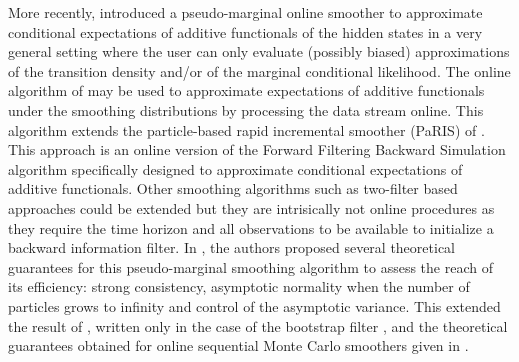 \documentclass{article}
\begin{document}
More recently,  \cite{gloaguen2021pseudo} introduced a pseudo-marginal online smoother to approximate conditional expectations of additive functionals of the hidden states  in  a very general setting where the user can only evaluate (possibly biased) approximations of the transition density and/or of the marginal conditional likelihood. The online algorithm of \cite{gloaguen2021pseudo} may be used to approximate expectations of additive functionals under the smoothing distributions by processing the data stream online. This algorithm extends the particle-based rapid incremental smoother (PaRIS) of \cite{olsson2017efficient}. This approach is an online version of the Forward Filtering Backward Simulation algorithm \cite{douc2011sequential} specifically designed to approximate conditional expectations of additive functionals. Other smoothing algorithms such as two-filter based approaches \cite{briers2010smoothing, fearnhead2010sequential, nguyen2017two}  could be extended  but they are intrisically not online procedures as they require the time horizon and all observations to be available  to initialize a backward information filter. In \cite{gloaguen2021pseudo}, the authors proposed several theoretical guarantees for this pseudo-marginal smoothing algorithm to assess the reach of its efficiency: strong consistency, asymptotic normality when the number of particles grows to infinity and control of the asymptotic variance. %
  This extended the result of \cite{olsson2017efficient}, written only in the case of the bootstrap filter \cite{gordon1993novel}, and the theoretical guarantees obtained for online sequential Monte Carlo smoothers given in \cite{delmoral2010backward, douc2011sequential, dubarry2013nonasymptotic, gerber2017convergence}.


\end{document}
